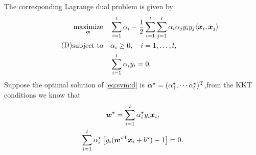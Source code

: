 \documentclass[a4paper]{article}
\begin{document}
{\begin{enumerate}
\begin{enumerate}
        \noindent The corresponding Lagrange dual problem is given by
        \begin{equation}
            \tag{D}
            \begin{aligned}
            &\operatorname*{maximize}_{\bm{\alpha}}& &\sum_{i=1}^{l} \alpha_i - \frac12 \sum_{i=1}^{l} 
            \sum_{j=1}^{l} \alpha_i \alpha_j y_i y_j \langle \bm{x}_i,\bm{x}_j \rangle\\
            &\mathrm{subject~to}& &\alpha_i \geq 0, \quad i = 1, \dots, l,\\
            &&&\sum_{i=1}^{l} \alpha_i y_i = 0.
            \end{aligned}
            \label{eq:svm:d}
        \end{equation}
        Suppose the optimal solution of \eqref{eq:svm:d} is $\bm{\alpha}^{\star}=(\alpha_{1}^{\star},
            \cdots \alpha_l^{\star})^{\mathrm{T}}$,from the KKT conditions we know that
        \begin{equation}
        \begin{gathered}
            \bm{w}^{\star} = \sum_{i=1}^{l}\alpha_i^{\star}y_i\bm{x}_i,\\
            \sum_{i=1}^{l}\alpha_i^{\star}\left[y_i(\bm{w}^{\star\mathrm{T}}\bm{x}_i+b^{\star})-1\right] = 0.
        \end{gathered}
        \label{eq:kkt}
        \end{equation}


\end{enumerate}
\end{enumerate}}
\end{document}
